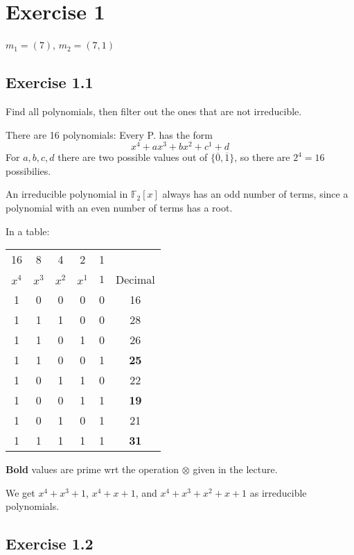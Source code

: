 \documentclass[a4paper]{scrreprt}
\newcommand\F{\mathbb F}
\renewcommand*{\arraystretch}{1.5}
\begin{document}
\section*{Exercise 1}

$m_1=(7)$, $m_2=(7,1)$

\subsection*{Exercise 1.1}

Find all polynomials, then filter out the ones that are not irreducible.

There are 16 polynomials: Every P. has the form
\[x^4 + ax^3 + bx^2 + c^1 + d\]
For $a,b,c,d$ there are two possible values out of $\{\overline 0, \overline 1\}$,
so there are $2^4=16$ possibilies.

An irreducible polynomial in $\F_2[x]$ always has an odd number of terms, since a polynomial with
an even number of terms has a root.

In a table:
\begin{center}
    \renewcommand*{\arraystretch}{1}
    \begin{tabular}{ccccc|c}
        16 & 8 & 4 & 2 & 1 & \\
        $x^4$ &$x^3$ &$x^2$ & $x^1$ & $1$ & Decimal \\
        \hline
        1 & 0 & 0 & 0 & 0 & 16 \\
        1 & 1 & 1 & 0 & 0 & 28 \\
        1 & 1 & 0 & 1 & 0 & 26 \\
        1 & 1 & 0 & 0 & 1 & \textbf{25} \\
        1 & 0 & 1 & 1 & 0 & 22 \\
        1 & 0 & 0 & 1 & 1 & \textbf{19} \\
        1 & 0 & 1 & 0 & 1 & 21 \\
        1 & 1 & 1 & 1 & 1 & \textbf{31} \\
    \end{tabular}
\end{center}
\textbf{Bold} values are prime wrt the operation $\otimes$ given in the lecture.

We get $x^4+x^3+1$, $x^4+x+1$, and $x^4+x^3+x^2+x+1$ as irreducible polynomials.

\subsection*{Exercise 1.2}
\end{document}
